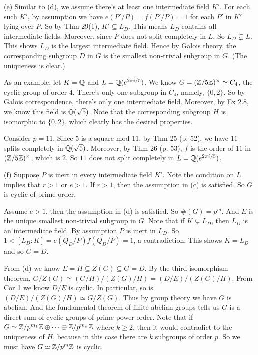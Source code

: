 \documentclass[../Marcus.tex]{subfiles}
\begin{document}
(e) Similar to (d), we assume there's at least one intermediate field $K'$. For each such $K'$, by assumption we have $e(P'/P)=f(P'/P)=1$ for each $P'$ in $K'$ lying over $P$. So by Thm 29(1), $K'\subseteq L_D$. This means $L_D$ contains all intermediate fields. Moreover, since $P$ does not split completely in $L$. So $L_D\varsubsetneq L$. This shows $L_D$ is the largest intermediate field. Hence by Galois theory, the corresponding subgroup $D$ in $G$ is the smallest non-trivial subgroup in $G$. (The uniqueness is clear.)

As an example, let $K=\mathbb{Q}$ and $L=\mathbb{Q}(e^{2\pi i/5})$. We know $G=(\mathbb{Z}/5\mathbb{Z})^\times\simeq C_4$, the cyclic group of order $4$. There's only one subgroup in $C_4$, namely, $\{0,2\}$. So by Galois correspondence, there's only one intermediate field. Moreover, by Ex 2.8, we know this field is $\mathbb{Q}(\sqrt{5})$. Note that the corresponding subgroup $H$ is isomorphic to $\{0,2\}$, which clearly has the desired properties.

Consider $p=11$. Since $5$ is a square mod $11$, by Thm 25 (p. 52), we have $11$ splits completely in $\mathbb{Q}(\sqrt{5})$. Moreover, by Thm 26 (p. 53), $f$ is the order of $11$ in $(\mathbb{Z}/5\mathbb{Z})^\times$, which is $2$. So $11$ does not split completely in $L=\mathbb{Q}(e^{2\pi i/5})$.

(f) Suppose $P$ is inert in every intermediate field $K'$. Note the condition on $L$ implies that $r>1$ or $e>1$. If $r>1$, then the assumption in (c) is satisfied. So $G$ is cyclic of prime order.

Assume $e>1$, then the assumption in (d) is satisfied. So $\#(G)=p^m$. And $E$ is the unique smallest non-trivial subgroup in $G$. Note that if $K\varsubsetneq L_D$, then $L_D$ is an intermediate field. By assumption $P$ is inert in $L_D$. So $1<[L_D:K]=e(Q_D/P)f(Q_D/P)=1$, a contradiction. This shows $K=L_D$ and so $G=D$.

From (d) we know $E=H\subseteq Z(G)\subseteq G=D$. By the third isomorphism theorem, $G/Z(G) \simeq (G/H)/(Z(G)/H) = (D/E)/(Z(G)/H)$. From Cor 1 we know  $D/E$ is cyclic. In particular, so is $(D/E)/(Z(G)/H)\simeq G/Z(G)$. Thus by group theory we have $G$ is abelian. And the fundamental theorem of finite abelian groups tells us $G$ is a direct sum of cyclic groups of prime power order. Note that if $G\simeq \mathbb{Z}/p^{m_1}\mathbb{Z}\oplus\cdots\oplus\mathbb{Z}/p^{m_k}\mathbb{Z}$ where $k\geq 2$, then it would contradict to the uniqueness of $H$, because in this case there are $k$ subgroups of order $p$. So we must have $G\simeq \mathbb{Z}/p^m\mathbb{Z}$ is cyclic.
\end{document}
